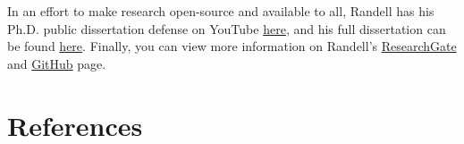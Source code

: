 \documentclass[11pt]{article}
\begin{document}
In an effort to make research open-source and available to all, Randell 
has his Ph.D. public dissertation defense on YouTube 
\href{https://www.youtube.com/watch?v=PpVOXf6_830\&t=162s}{here}, and 
his full dissertation can be found 
\href{https://ir.library.oregonstate.edu/concern/graduate_thesis_or_dissertations/2v23w237z}{here}.
Finally, you can view more information on Randell's 
\href{https://www.researchgate.net/profile/Zachary-Randell}{ResearchGate}
 and \href{https://github.com/zhrandell}{GitHub} page. 





\clearpage
\section{References}
\printbibliography[heading=none]
\label{References}





\end{document}
